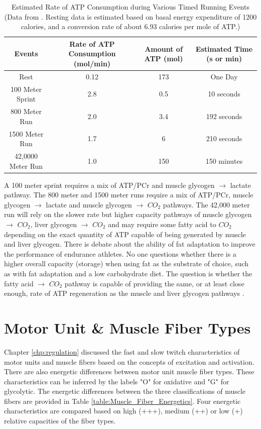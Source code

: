 \begin{table}[h!]
\centering
\begin{tabular}{||c c c c||} 
 \hline
Events & Rate of ATP Consumption (mol/min) & Amount of ATP (mol) & Estimated Time (s or min)\\ [0.5ex] 
 \hline\hline
 Rest & 0.12  & 173 & One Day \\
 100 Meter Sprint & 2.8 & 0.5 & 10 seconds \\ 
 800 Meter Run & 2.0 & 3.4 & 192 seconds\\
 1500 Meter Run & 1.7 & 6 & 210 seconds \\ 
 42,0000 Meter Run & 1.0 & 150 & 150 minutes \\[1ex] 
 \hline
\end{tabular}
\caption{Estimated Rate of ATP Consumption during Various Timed Running Events (\footnotesize{Data from \cite{feher_quantitative_2017}. Resting data is estimated based on basal energy expenditure of 1200 calories, and a conversion rate of about 6.93 calories per mole of ATP.})}
\label{table:Event_ATP_Rates}
\end{table}
 
A 100 meter sprint requires a mix of ATP/PCr and muscle glycogen $\rightarrow$ lactate pathway. The 800 meter and 1500 meter runs require a mix of ATP/PCr, muscle glycogen $\rightarrow$ lactate and muscle glycogen $\rightarrow$ $CO_2$ pathways. The 42,000 meter run will rely on the slower rate but higher capacity pathways of muscle glycogen $\rightarrow$ $CO_2$, liver glycogen $\rightarrow$ $CO_2$ and may require some fatty acid to $CO_2$ depending on the exact quantity of ATP capable of being generated by muscle and liver glycogen. There is debate about the ability of fat adaptation to improve the performance of endurance athletes. No one questions whether there is a higher overall capacity (storage) when using fat as the substrate of choice, such as with fat adaptation and a low carbohydrate diet. The question is whether the fatty acid $\rightarrow$ $CO_2$ pathway is capable of providing the same, or at least close enough, rate of ATP regeneration as the muscle and liver glycogen pathways \cite{mcswiney_keto-adaptation_2018}.

\section{Motor Unit \& Muscle Fiber Types}

Chapter \ref{chp:regulation} discussed the fast and slow twitch characteristics of motor units and muscle fibers based on the concepts of excitation and activation. There are also energetic differences between motor unit muscle fiber types. These characteristics can be inferred by the labels "O" for oxidative and "G" for glycolytic. The energetic differences between the three classifications of muscle fibers are provided in Table \ref{table:Muscle_Fiber_Energetics}. Four energetic characteristics are compared based on high (+++), medium (++) or low (+) relative capacities of the fiber types. 

